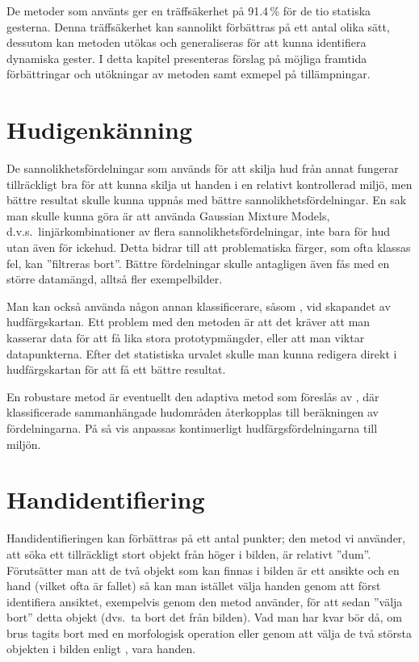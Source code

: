 \documentclass[../rapport_MVEX01-11-05]{subfiles}
\begin{document}
De metoder som använts ger en träffsäkerhet på 91.4\,\% för de tio statiska
gesterna. Denna träffsäkerhet kan sannolikt förbättras på ett antal
olika sätt, dessutom
kan metoden utökas och generaliseras för att kunna identifiera
dynamiska gester. I detta kapitel presenteras förslag på möjliga framtida
förbättringar och utökningar av metoden samt exmepel på tillämpningar.

\section{Hudigenkänning}
De sannolikhetsfördelningar som används för att skilja hud från annat
fungerar tillräckligt bra för att kunna skilja ut handen i en
relativt kontrollerad miljö, men bättre resultat skulle kunna uppnås
med bättre sannolikhetsfördelningar. En sak man skulle kunna göra
är att använda Gaussian Mixture Models, d.v.s.~linjärkombinationer av flera
sannolikhetsfördelningar, inte bara för hud utan även för ickehud.
Detta bidrar till att problematiska färger, som ofta klassas fel,
kan ''filtreras bort''.
Bättre fördelningar skulle
antagligen även fås med en större datamängd, alltså fler
exempelbilder.

Man kan också använda någon annan klassificerare, såsom \knn,
vid skapandet av hudfärgskartan. Ett problem med den metoden är att det
kräver att man kasserar data för att få lika stora prototypmängder,
eller att man viktar datapunkterna.
Efter det statistiska urvalet skulle man kunna redigera direkt i
hudfärgskartan för att få ett bättre resultat.

En robustare metod är eventuellt den adaptiva metod som föreslås av
, där klassificerade sammanhängade
hudområden återkopplas till beräkningen av fördelningarna.
På så vis anpassas kontinuerligt hudfärgsfördelningarna till miljön.

\section{Handidentifiering}
Handidentifieringen kan förbättras på ett antal punkter;
den metod vi använder, att söka ett tillräckligt stort objekt från höger i
bilden, är relativt ''dum''. Förutsätter man att de två objekt som kan finnas
i bilden är ett ansikte och en hand (vilket ofta är fallet) så kan man
istället välja handen genom att först identifiera ansiktet, exempelvis genom
den metod  använder, för att sedan ''välja bort'' detta
objekt (dvs.~ta bort det från bilden). Vad man har kvar bör då, om brus tagits
bort med en morfologisk operation eller genom att välja de två största
objekten i bilden enligt , vara handen.
\end{document}
